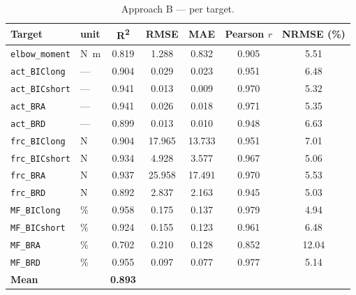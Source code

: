 \begin{table}[H]
\centering
\caption{Approach B --- per target.}
\label{tab:appB}
\small
\begin{tabular}{@{}llccccc@{}}
\toprule
\textbf{Target} & \textbf{unit} & \textbf{R\textsuperscript{2}} & \textbf{RMSE} &
\textbf{MAE} & \textbf{Pearson $r$} & \textbf{NRMSE (\%)} \\
\midrule
\texttt{elbow\_moment} & \si{\newton\metre} & 0.819 & 1.288 & 0.832 & 0.905 & 5.51 \\
\addlinespace
\texttt{act\_BIClong}  & --- & 0.904 & 0.029 & 0.023 & 0.951 & 6.48 \\
\texttt{act\_BICshort} & --- & 0.941 & 0.013 & 0.009 & 0.970 & 5.32 \\
\texttt{act\_BRA}      & --- & 0.941 & 0.026 & 0.018 & 0.971 & 5.35 \\
\texttt{act\_BRD}      & --- & 0.899 & 0.013 & 0.010 & 0.948 & 6.63 \\
\addlinespace
\texttt{frc\_BIClong}  & \si{\newton} & 0.904 & 17.965 & 13.733 & 0.951 & 7.01 \\
\texttt{frc\_BICshort} & \si{\newton} & 0.934 &  4.928 &  3.577 & 0.967 & 5.06 \\
\texttt{frc\_BRA}      & \si{\newton} & 0.937 & 25.958 & 17.491 & 0.970 & 5.53 \\
\texttt{frc\_BRD}      & \si{\newton} & 0.892 &  2.837 &  2.163 & 0.945 & 5.03 \\
\addlinespace
\texttt{MF\_BIClong}   & \si{\percent} & 0.958 & 0.175 & 0.137 & 0.979 &  4.94 \\
\texttt{MF\_BICshort}  & \si{\percent} & 0.924 & 0.155 & 0.123 & 0.961 &  6.48 \\
\texttt{MF\_BRA}       & \si{\percent} & 0.702 & 0.210 & 0.128 & 0.852 & 12.04 \\
\texttt{MF\_BRD}       & \si{\percent} & 0.955 & 0.097 & 0.077 & 0.977 &  5.14 \\
\midrule
\textbf{Mean} & & \textbf{0.893} & & & & \\
\bottomrule
\end{tabular}
\end{table}

